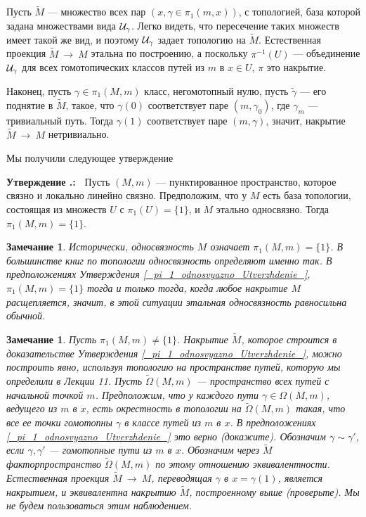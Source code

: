 \documentclass[12pt]{book}
\newcommand{\arrow}{{\:\longrightarrow\:}}
\def\endproof{\hbox{\vrule width 5pt height 5pt depth 0pt}}
\theoremstyle{upshape}
\newtheorem{zadacha}{Задача}[chapter]
\theoremstyle{generic}
\newtheorem{remark}[teorema]{Замечание}
\def\замечание{\begin{remark}}
\def\еза{\end{remark}}
\theoremstyle{upshapenonumber}
\newtheorem{ukazanie}{Указание}[section]
\newcommand{\следствие}{%
     \refstepcounter{teorema}
     {\noindent\bf Следствие \thechapter.\arabic{teorema}:\ }}
\newcommand{\пример}{%
     \refstepcounter{teorema}
     {\noindent\bf Пример \thechapter.\arabic{teorema}:\ }}
\newcommand{\лемма}{%
     \refstepcounter{teorema}
     {\noindent\bf Лемма \thechapter.\arabic{teorema}:\ }}
\newcommand{\теорема}{%
     \refstepcounter{teorema}
     {\noindent\bf Теорема \thechapter.\arabic{teorema}:\ }}
\newcommand{\утверждение}{%
     \refstepcounter{teorema}
     {\noindent\bf Утверждение \thechapter.\arabic{teorema}:\ }}
\def\хфилл{\hfill}
\def\ем{\em}
\def\задача{\begin{zadacha}}
\def\ез{\end{zadacha}}
\def\указание{\begin{ukazanie}}
\def\еу{\end{ukazanie}}
\def\ео{\end{opredelenie}}
\def\енум{\begin{enumerate}}
\def\ее{\end{enumerate}}
\begin{document}
Пусть $\tilde M$ --- множество всех пар 
$(x, \gamma \in \pi_1(m,x))$, с топологией,
база которой задана множествами вида
${\cal U}_\gamma$. Легко видеть, что
пересечение таких множеств имеет такой
же вид, и поэтому ${\cal U}_\gamma$ задает
топологию на $\tilde M$. Естественная
проекция $\tilde M \arrow M$ этальна
по построению, а поскольку
$\pi^{-1}(U)$ --- объединение
${\cal U}_\gamma$ для всех гомотопических
классов путей из $m$ в $x\in U$,
$\pi$ это накрытие.

Наконец, пусть 
$\gamma \in \pi_1(M,m)$ класс, негомотопный нулю, пусть
$\tilde \gamma$ --- его поднятие в $\tilde M$,
такое, что $\gamma(0)$ соответствует паре $(m, \gamma_0)$,
где $\gamma_m$ --- тривиальный путь. 
Тогда $\gamma(1)$ соответствует паре $(m, \gamma)$,
значит, накрытие $\tilde M \arrow M$ нетривиально.

Мы получили следующее утверждение

\хфилл

\утверждение\label{_pi_1_odnosvyazno_Utverzhdenie_}
Пусть $(M,m)$ --- пунктированное пространство,
которое связно и локально линейно связно.
Предположим, что у $M$ есть база топологии,
состоящая из множеств $U$ с $\pi_1(U)=\{1\}$,
и $M$ этально односвязно. Тогда $\pi_1(M,m)=\{1\}$.

\endproof

\хфилл

\замечание
Исторически, односвязность $M$ означает $\pi_1(M,m)=\{1\}$.
В большинстве книг по топологии односвязность определяют именно так.
В предположениях Утверждения \ref{_pi_1_odnosvyazno_Utverzhdenie_},
$\pi_1(M,m)=\{1\}$ тогда и только тогда, когда любое накрытие
$M$ расщепляется, значит, в этой ситуации этальная
односвязность
равносильна обычной.
\еза

\замечание
Пусть $\pi_1(M, m)\neq \{1\}$. Накрытие $\tilde M$,
которое строится в доказательстве Утверждения 
\ref{_pi_1_odnosvyazno_Utverzhdenie_}, можно
построить явно, используя топологию
на пространстве путей, которую мы 
определили в Лекции 11. Пусть $\tilde \Omega(M,m)$ --- пространство
всех путей с начальной точкой $m$. Предположим,
что у каждого пути $\gamma \in \Omega(M,m)$, ведущего из $m$ в $x$,
есть окрестность в топологии на $\tilde \Omega(M,m)$
такая, что все ее точки гомотопны $\gamma$ в классе
путей из $m$ в $x$. В предположениях \ref{_pi_1_odnosvyazno_Utverzhdenie_}
это верно (докажите). Обозначим $\gamma \sim \gamma'$, если
$\gamma, \gamma'$ --- гомотопные пути из $m$ в $x$.
Обозначим через $\tilde M$ факторпространство $\tilde \Omega(M,m)$ 
по этому отношению эквивалентности. Естественная
проекция $\tilde M \arrow M$, переводящая $\gamma$ 
в $x=\gamma(1)$, является накрытием, и эквивалентна
накрытию $\tilde M$, построенному выше (проверьте).
Мы не будем пользоваться этим наблюдением.
\еза
\end{document}
